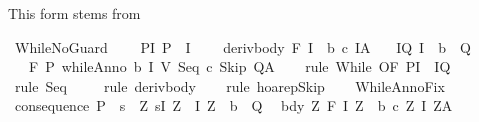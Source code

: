 \begin{isabellebody}
\begin{isamarkuptext}
This form stems from %
\end{isamarkuptext}\isamarkuptrue%
\isamarkupfalse%
\ WhileNoGuard{\isacharprime}{\isacharcolon}\ \isanewline
\ \ \ P{\isacharunderscore}I{\isacharcolon}\ {\isachardoublequoteopen}P\ {\isasymsubseteq}\ I{\isachardoublequoteclose}\ \isanewline
\ \ \ deriv{\isacharunderscore}body{\isacharcolon}\ {\isachardoublequoteopen}{\isasymGamma}{\isacharcomma}{\isasymTheta}{\isasymturnstile}\isactrlbsub {\isacharslash}F\isactrlesub \ {\isacharparenleft}I\ {\isasyminter}\ b{\isacharparenright}\ c\ I{\isacharcomma}A{\isachardoublequoteclose}\isanewline
\ \ \ I{\isacharunderscore}Q{\isacharcolon}\ {\isachardoublequoteopen}I\ {\isasyminter}\ {\isacharminus}b\ {\isasymsubseteq}\ Q{\isachardoublequoteclose}\ \isanewline
\ \ \ {\isachardoublequoteopen}{\isasymGamma}{\isacharcomma}{\isasymTheta}{\isasymturnstile}\isactrlbsub {\isacharslash}F\isactrlesub \ P\ {\isacharparenleft}whileAnno\ b\ I\ V\ {\isacharparenleft}Seq\ c\ Skip{\isacharparenright}{\isacharparenright}\ Q{\isacharcomma}A{\isachardoublequoteclose}\isanewline
%
\isadelimproof
\ \ %
\endisadelimproof
%
\isatagproof
{}\isamarkupfalse%
\ {\isacharparenleft}rule\ While\ {\isacharbrackleft}OF\ P{\isacharunderscore}I\ {\isacharunderscore}\ I{\isacharunderscore}Q{\isacharbrackright}{\isacharparenright}\isanewline
\ \ \isamarkupfalse%
\ {\isacharparenleft}rule\ Seq{\isacharparenright}\isanewline
\ \ \isamarkupfalse%
\ \ {\isacharparenleft}rule\ deriv{\isacharunderscore}body{\isacharparenright}\isanewline
\ \ \isamarkupfalse%
\ {\isacharparenleft}rule\ hoarep{\isachardot}Skip{\isacharparenright}\isanewline
\ \ \isamarkupfalse%
%
\endisatagproof
{\isafoldproof}%
%
\isadelimproof
\isanewline
%
\endisadelimproof
\isanewline
{}\isamarkupfalse%
\ WhileAnnoFix{\isacharcolon}\isanewline
{}\ consequence{\isacharcolon}\ {\isachardoublequoteopen}P\ {\isasymsubseteq}\ {\isacharbraceleft}s{\isachardot}\ {\isacharparenleft}{\isasymexists}\ Z{\isachardot}\ s{\isasymin}I\ Z\ {\isasymand}\ {\isacharparenleft}I\ Z\ {\isasyminter}\ {\isacharminus}b\ {\isasymsubseteq}\ Q{\isacharparenright}{\isacharparenright}\ {\isacharbraceright}{\isachardoublequoteclose}\isanewline
{}\ bdy{\isacharcolon}\ {\isachardoublequoteopen}{\isasymforall}Z{\isachardot}\ {\isasymGamma}{\isacharcomma}{\isasymTheta}{\isasymturnstile}\isactrlbsub {\isacharslash}F\isactrlesub \ {\isacharparenleft}I\ Z\ {\isasyminter}\ b{\isacharparenright}\ {\isacharparenleft}c\ Z{\isacharparenright}\ {\isacharparenleft}I\ Z{\isacharparenright}{\isacharcomma}A{\isachardoublequoteclose}\isanewline

\end{isabellebody}
